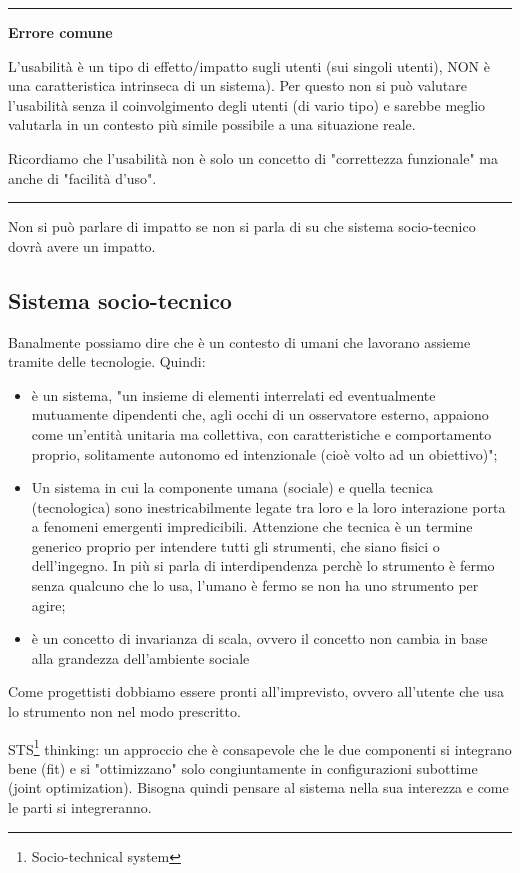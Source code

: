 \documentclass[11pt,a4paper]{book}
\begin{document}
\noindent\rule{\textwidth}{1pt}
\begin{center}
	\textbf{Errore comune}
\end{center}

L'usabilità è un tipo di effetto/impatto sugli utenti (sui singoli utenti), NON è una caratteristica intrinseca di un sistema). Per questo non si può valutare l'usabilità senza il coinvolgimento degli utenti (di vario tipo) e sarebbe meglio valutarla in un contesto più simile possibile a una situazione reale.

Ricordiamo che l'usabilità non è solo un concetto di "correttezza funzionale" ma anche di "facilità d'uso".

\noindent\rule{\textwidth}{1pt}

Non si può parlare di impatto se non si parla di su che sistema socio-tecnico dovrà avere un impatto.
\subsection{Sistema socio-tecnico}
Banalmente possiamo dire che è un contesto di umani che lavorano assieme tramite delle tecnologie. Quindi:
\begin{itemize}
	\item è un sistema, "un insieme di elementi interrelati ed eventualmente mutuamente dipendenti che, agli occhi di un osservatore esterno, appaiono come un'entità unitaria ma collettiva, con caratteristiche e comportamento proprio, solitamente autonomo ed intenzionale (cioè volto ad un obiettivo)";
	\item Un sistema in cui la componente umana  (sociale) e quella tecnica (tecnologica) sono inestricabilmente legate tra loro e la loro interazione porta a fenomeni emergenti impredicibili. Attenzione che tecnica è un termine generico proprio per intendere tutti gli strumenti, che siano fisici o dell'ingegno. In più si parla di interdipendenza perchè lo strumento è fermo senza qualcuno che lo usa, l'umano è fermo se non ha uno strumento per agire;
	\item è un concetto di invarianza di scala, ovvero il concetto non cambia in base alla grandezza dell'ambiente sociale
\end{itemize}
Come progettisti dobbiamo essere pronti all'imprevisto, ovvero all'utente che usa lo strumento non nel modo prescritto.

STS\footnote{Socio-technical system} thinking: un approccio che è consapevole che le due componenti si integrano bene (fit) e si "ottimizzano" solo congiuntamente in configurazioni subottime (joint optimization). Bisogna quindi pensare al sistema nella sua interezza e come le parti si integreranno.
\end{document}
